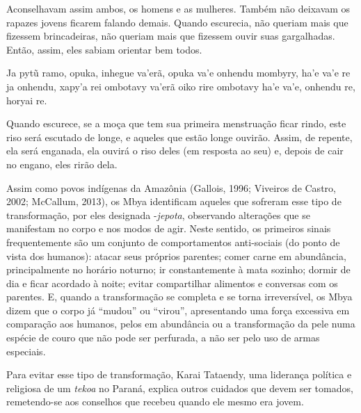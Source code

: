 \begin{paracol}{2}
\bigskip

\switchcolumn
\noindent
Aconselhavam assim ambos, os homens e as mulheres. Também não deixavam
os rapazes jovens ficarem falando demais. Quando escurecia, não queriam
mais que fizessem brincadeiras, não queriam mais que fizessem ouvir
suas gargalhadas. Então, assim, eles sabiam orientar bem todos. 

\smallskip

\switchcolumn
\noindent
Ja pytũ ramo, opuka, inhegue va’erã, opuka va’e onhendu mombyry, ha’e
va’e re ja onhendu, xapy’a rei ombotavy va’erã oiko rire ombotavy ha’e
va’e, onhendu re, horyai re.

\bigskip

\switchcolumn
\noindent
Quando escurece, se a moça que tem sua primeira menstruação ficar rindo,
este riso será escutado de longe, e aqueles que estão longe ouvirão.
Assim, de repente, ela será enganada, ela ouvirá o riso deles (em
resposta ao seu) e, depois de cair no engano, eles rirão
dela.\footnotemark{}
\end{paracol}

Assim como povos indígenas da Amazônia (Gallois, 1996; Viveiros de
Castro, 2002; McCallum, 2013), os Mbya identificam aqueles que sofreram
esse tipo de transformação, por eles designada -\emph{jepota}, observando
alterações que se manifestam no corpo e nos modos de agir. Neste
sentido, os primeiros sinais frequentemente são um conjunto de
comportamentos anti-sociais (do ponto de vista dos humanos): atacar
seus próprios parentes; comer carne em abundância, principalmente no
horário noturno; ir constantemente à mata sozinho; dormir de dia e
ficar acordado à noite; evitar compartilhar alimentos e conversas com
os parentes. E, quando a transformação se completa e se torna
irreversível, os Mbya dizem que o corpo já ``mudou'' ou ``virou'',
apresentando uma força excessiva em comparação aos humanos, pelos em
abundância ou a transformação da pele numa espécie de couro que não
pode ser perfurada, a não ser pelo uso de armas especiais. 

Para evitar esse tipo de transformação, Karai Tataendy, uma liderança
política e religiosa de um \emph{tekoa} no Paraná, explica outros cuidados que
devem ser tomados, remetendo-se aos conselhos que recebeu quando ele
mesmo era jovem. 

